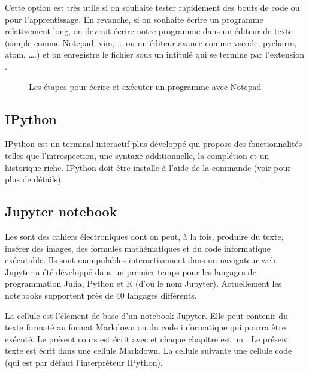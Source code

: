 \documentclass[letterpaper,10pt,french]{sphinxmanual}
\let\sphinxpxdimen\pdfpxdimen\else\newdimen\sphinxpxdimen
\begin{document}
\sphinxAtStartPar
Cette option est très utile si on souhaite tester rapidement des bouts de code ou pour l’apprentissage.
En revanche, si on souhaite écrire un programme relativement long, on devrait écrire notre programme dans un éditeur de texte (simple comme Notepad, vim, … ou un éditeur avance comme vscode, pycharm, atom, ….) et on enregistre le fichier sous un intitulé qui se termine par l’extension .

\begin{figure}[htbp]
\centering
\capstart

\noindent\sphinxincludegraphics[width=400\sphinxpxdimen]{{scriptnote}.PNG}
\caption{Les étapes pour écrire et exécuter un programme avec Notepad}\label{\detokenize{ch01:markdown-fig1}}\end{figure}


\subsection{IPython}
\label{\detokenize{ch01:ipython}}
\sphinxAtStartPar
IPython est un terminal interactif plus développé qui propose des fonctionnalités telles que l’introspection, une syntaxe additionnelle, la complétion et un historique riche. IPython doit être installe à l’aide de la commande  (voir  pour plus de détails).


\subsection{Jupyter notebook}
\label{\detokenize{ch01:jupyter-notebook}}
\sphinxAtStartPar
Les  sont des cahiers électroniques dont on peut, à la fois, produire du texte, insérer des images, des formules mathématiques et du code informatique exécutable. Ils sont manipulables interactivement dans un navigateur web. Jupyter a été développé dans un premier temps pour les langages de programmation Julia, Python et R (d’où le nom Jupyter). Actuellement les notebooks supportent près de 40 langages différents.

\sphinxAtStartPar
La cellule est l’élément de base d’un notebook Jupyter. Elle peut contenir du texte formaté au format Markdown ou du code informatique qui pourra être exécuté. Le présent cours est écrit avec  et chaque chapitre est un . Le présent texte est écrit dans une cellule Markdown. La cellule suivante une cellule code (qui est par défaut l’interpréteur IPython).
\end{document}
